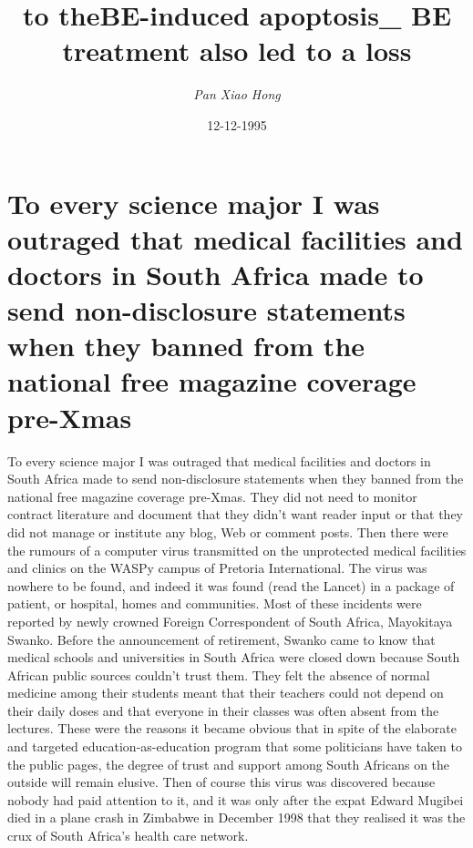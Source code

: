 \documentclass{article}%
\title{to theBE{-}induced apoptosis\_ BE treatment also led to a loss}%
\author{\textit{Pan Xiao Hong}}%
\date{12-12-1995}%
\begin{document}
%
\normalsize%
\maketitle%
\section{To every science major I was outraged that medical facilities and doctors in South Africa made to send non{-}disclosure statements when they banned from the national free magazine coverage pre{-}Xmas}%
\label{sec:ToeverysciencemajorIwasoutragedthatmedicalfacilitiesanddoctorsinSouthAfricamadetosendnon{-}disclosurestatementswhentheybannedfromthenationalfreemagazinecoveragepre{-}Xmas}%
To every science major I was outraged that medical facilities and doctors in South Africa made to send non{-}disclosure statements when they banned from the national free magazine coverage pre{-}Xmas.\newline%
They did not need to monitor contract literature and document that they didn't want reader input or that they did not manage or institute any blog, Web or comment posts.\newline%
Then there were the rumours of a computer virus transmitted on the unprotected medical facilities and clinics on the WASPy campus of Pretoria International. The virus was nowhere to be found, and indeed it was found (read the Lancet) in a package of patient, or hospital, homes and communities.\newline%
Most of these incidents were reported by newly crowned Foreign Correspondent of South Africa, Mayokitaya Swanko. Before the announcement of retirement, Swanko came to know that medical schools and universities in South Africa were closed down because South African public sources couldn't trust them.\newline%
They felt the absence of normal medicine among their students meant that their teachers could not depend on their daily doses and that everyone in their classes was often absent from the lectures. These were the reasons it became obvious that in spite of the elaborate and targeted education{-}as{-}education program that some politicians have taken to the public pages, the degree of trust and support among South Africans on the outside will remain elusive.\newline%
Then of course this virus was discovered because nobody had paid attention to it, and it was only after the expat Edward Mugibei died in a plane crash in Zimbabwe in December 1998 that they realised it was the crux of South Africa's health care network.\newline%
\end{document}
